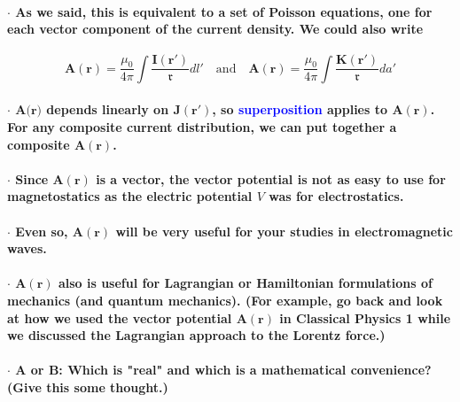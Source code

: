 \documentclass{article}
\begin{document}
\paragraph{\indent\indent $\cdot$ As we said, this is equivalent to a set of Poisson equations, one for each vector component of the current density. We could also write}
\begin{equation*}
    \boldsymbol{A}(\boldsymbol{r})=\frac{\mu_0}{4\pi}\int\frac{\boldsymbol{I}(\boldsymbol{r}')}{\mathfrak{r}}dl'\quad\text{and}\quad \boldsymbol{A}(\boldsymbol{r})=\frac{\mu_0}{4\pi}\int\frac{\boldsymbol{K}(\boldsymbol{r}')}{\mathfrak{r}}da'
\end{equation*}
\paragraph{\indent\indent $\cdot$ $\boldsymbol{A}(\boldsymbol{r)}$ depends linearly on $\boldsymbol{J}(\boldsymbol{r}')$, so \textcolor{blue}{superposition} applies to $\boldsymbol{A}(\boldsymbol{r})$. For any composite current distribution, we can put together a composite $\boldsymbol{A}(\boldsymbol{r})$.}
\paragraph{\indent\indent $\cdot$ Since $\boldsymbol{A}(\boldsymbol{r})$ is a vector, the vector potential is not as easy to use for magnetostatics as the electric potential $V$ was for electrostatics.}
\paragraph{\indent\indent $\cdot$ Even so, $\boldsymbol{A}(\boldsymbol{r})$ will be very useful for your studies in electromagnetic waves.}
\paragraph{\indent\indent $\cdot$ $\boldsymbol{A}(\boldsymbol{r})$ also is useful for Lagrangian or Hamiltonian formulations of mechanics (and quantum mechanics). (For example, go back and look at how we used the vector potential $\boldsymbol{A}(\boldsymbol{r})$ in Classical Physics 1 while we discussed the Lagrangian approach to the Lorentz force.)}
\paragraph{\indent\indent $\cdot$ $\boldsymbol{A}$ or $\boldsymbol{B}$: Which is "real" and which is a mathematical convenience? (Give this some thought.)}
\end{document}
